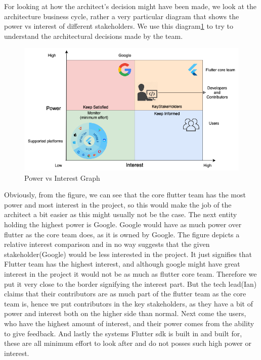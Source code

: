 \documentclass[conference, onecolumn]{IEEEtran}
\begin{document}
For looking at how the architect's decision might have been made, we look at the architecture business cycle, rather a very particular diagram that shows the power vs interest of different stakeholders. We use this diagram\ref{architecture} to try to understand the architectural decisions made by the team.
\begin{figure}[h]\label{architecture}
    \centering 
    \includegraphics[width=\textwidth]{images/flutter-pow-int.drawio.png}
    \caption{Power vs Interest Graph}
\end{figure}
Obviously, from the figure, we can see that the core flutter team has the most power and most interest in the project, so this would make the job of the architect a bit easier as this might usually not be the case. The next entity holding the highest power is Google. Google would have as much power over flutter as the core team does, as it is owned by Google. The figure depicts a relative interest comparison and in no way suggests that the given stakeholder(Google) would be less interested in the project. It just signifies that Flutter team has the highest interest, and although google might have great interest in the project it would not be as much as flutter core team. Therefore we put it very close to the border signifying the interest part. But the tech lead(Ian) claims that their contributors are as much part of the flutter team as the core team is, hence we put contributors in the key stakeholders, as they have a bit of power and interest both on the higher side than normal. 
Next come the users, who have the highest amount of interest, and their power comes from the ability to give feedback. And lastly the systems Flutter sdk is built in and built for, these are all minimum effort to look after and do not posses such high power or interest.
\end{document}
